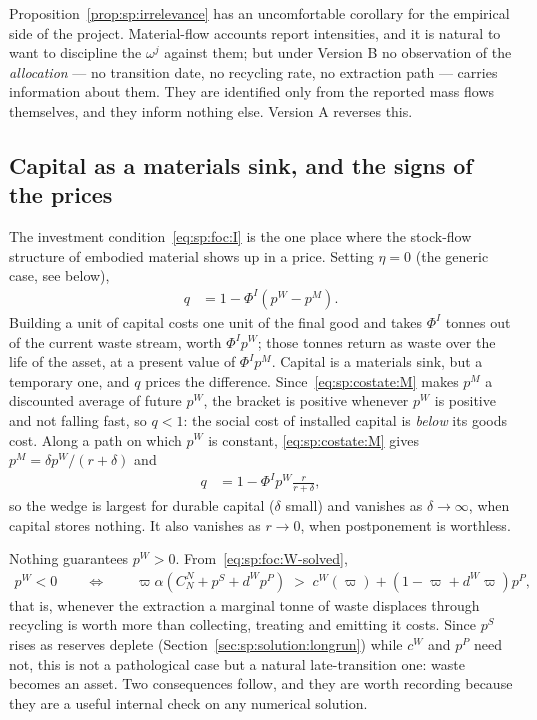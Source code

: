 Proposition~\ref{prop:sp:irrelevance} has an uncomfortable corollary for the empirical side of the
project. Material-flow accounts report intensities, and it is natural to want to discipline the
$\omega^j$ against them; but under Version B no observation of the \emph{allocation} --- no
transition date, no recycling rate, no extraction path --- carries information about them. They are
identified only from the reported mass flows themselves, and they inform nothing else. Version A
reverses this.


\subsection{Capital as a materials sink, and the signs of the prices}\label{sec:sp:solution:signs}

The investment condition~\eqref{eq:sp:foc:I} is the one place where the stock-flow structure of
embodied material shows up in a price. Setting $\eta=0$ (the generic case, see below),
\begin{align}
q &= 1-\Phi^I\left(p^W-p^M\right).
\label{eq:sp:solution:q}
\end{align}
Building a unit of capital costs one unit of the final good and takes $\Phi^I$ tonnes out of the
current waste stream, worth $\Phi^Ip^W$; those tonnes return as waste over the life of the asset,
at a present value of $\Phi^Ip^M$. Capital is a materials sink, but a temporary one, and $q$ prices
the difference. Since~\eqref{eq:sp:costate:M} makes $p^M$ a discounted average of future $p^W$, the
bracket is positive whenever $p^W$ is positive and not falling fast, so $q<1$: the social cost of
installed capital is \emph{below} its goods cost. Along a path on which $p^W$ is constant,
\eqref{eq:sp:costate:M} gives $p^M=\delta p^W/\left(r+\delta\right)$ and
\begin{align}
q &= 1-\Phi^Ip^W\frac{r}{r+\delta},
\label{eq:sp:solution:q-stationary}
\end{align}
so the wedge is largest for durable capital ($\delta$ small) and vanishes as $\delta\to\infty$, when
capital stores nothing. It also vanishes as $r\to0$, when postponement is worthless.

 Nothing guarantees $p^W>0$. From~\eqref{eq:sp:foc:W-solved},
\begin{align}
p^W<0
\qquad\Longleftrightarrow\qquad
\varpi\alpha\left(C^N_N+p^S+d^Wp^P\right)
\;>\;
c^W\!\left(\varpi\right)+\left(1-\varpi+d^W\varpi\right)p^P,
\label{eq:sp:solution:pW-sign}
\end{align}
that is, whenever the extraction a marginal tonne of waste displaces through recycling is worth more
than collecting, treating and emitting it costs. Since $p^S$ rises as reserves deplete
(Section~\ref{sec:sp:solution:longrun}) while $c^W$ and $p^P$ need not, this is not a pathological
case but a natural late-transition one: waste becomes an asset. Two consequences follow, and they
are worth recording because they are a useful internal check on any numerical solution.

